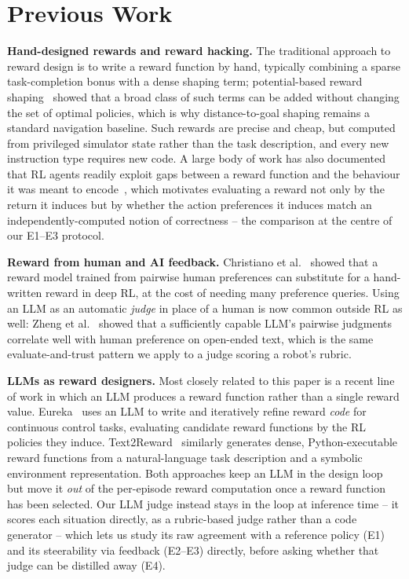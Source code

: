 \documentclass[10pt,twocolumn]{article}
\begin{document}
\section{Previous Work}
\label{sec:related}

\textbf{Hand-designed rewards and reward hacking.} The traditional
approach to reward design is to write a reward function by hand,
typically combining a sparse task-completion bonus with a dense shaping
term; potential-based reward shaping~\citep{ng1999shaping} showed that a
broad class of such terms can be added without changing the set of
optimal policies, which is why distance-to-goal shaping remains a
standard navigation baseline. Such rewards are precise and cheap, but
computed from privileged simulator state rather than the task
description, and every new instruction type requires new code. A large
body of work has also documented that RL agents readily exploit gaps
between a reward function and the behaviour it was meant to
encode~\citep{amodei2016concrete}, which motivates evaluating a reward
not only by the return it induces but by whether the action preferences
it induces match an independently-computed notion of correctness -- the
comparison at the centre of our E1--E3 protocol.

\textbf{Reward from human and AI feedback.} Christiano et
al.~\citep{christiano2017rlhf} showed that a reward model trained from
pairwise human preferences can substitute for a hand-written reward in
deep RL, at the cost of needing many preference queries. Using an LLM
as an automatic \emph{judge} in place of a human is now common outside
RL as well: Zheng et al.~\citep{zheng2023judging} showed that a
sufficiently capable LLM's pairwise judgments correlate well with human
preference on open-ended text, which is the same evaluate-and-trust
pattern we apply to a judge scoring a robot's rubric.

\textbf{LLMs as reward designers.} Most closely related to this paper
is a recent line of work in which an LLM produces a reward function
rather than a single reward value. Eureka~\citep{ma2024eureka} uses an
LLM to write and iteratively refine reward \emph{code} for continuous
control tasks, evaluating candidate reward functions by the RL policies
they induce. Text2Reward~\citep{xie2024text2reward} similarly generates
dense, Python-executable reward functions from a natural-language task
description and a symbolic environment representation. Both approaches
keep an LLM in the design loop but move it \emph{out} of the
per-episode reward computation once a reward function has been
selected. Our LLM judge instead stays in the loop at inference
time -- it scores each situation directly, as a rubric-based judge
rather than a code generator -- which lets us study its raw agreement
with a reference policy (E1) and its steerability via feedback (E2--E3)
directly, before asking whether that judge can be distilled away (E4).
\end{document}
